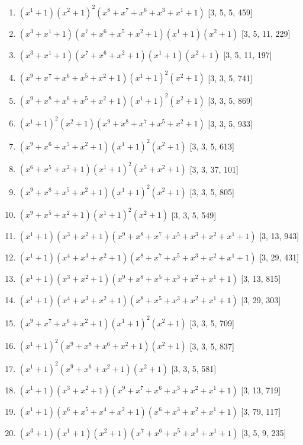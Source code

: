\documentclass[10pt,twocolumn]{article}
\begin{document}
\begin{enumerate}
\item $(x^{1} + 1)(x^{2} + 1)^{2}(x^{8} + x^{7} + x^{6} + x^{3} + x^{1} + 1)$  [3, 5, 5, 459]
\item $(x^{3} + x^{1} + 1)(x^{7} + x^{6} + x^{5} + x^{2} + 1)(x^{1} + 1)(x^{2} + 1)$  [3, 5, 11, 229]
\item $(x^{3} + x^{1} + 1)(x^{7} + x^{6} + x^{2} + 1)(x^{1} + 1)(x^{2} + 1)$  [3, 5, 11, 197]
\item $(x^{9} + x^{7} + x^{6} + x^{5} + x^{2} + 1)(x^{1} + 1)^{2}(x^{2} + 1)$  [3, 3, 5, 741]
\item $(x^{9} + x^{8} + x^{6} + x^{5} + x^{2} + 1)(x^{1} + 1)^{2}(x^{2} + 1)$  [3, 3, 5, 869]
\item $(x^{1} + 1)^{2}(x^{2} + 1)(x^{9} + x^{8} + x^{7} + x^{5} + x^{2} + 1)$  [3, 3, 5, 933]
\item $(x^{9} + x^{6} + x^{5} + x^{2} + 1)(x^{1} + 1)^{2}(x^{2} + 1)$  [3, 3, 5, 613]
\item $(x^{6} + x^{5} + x^{2} + 1)(x^{1} + 1)^{2}(x^{5} + x^{2} + 1)$  [3, 3, 37, 101]
\item $(x^{9} + x^{8} + x^{5} + x^{2} + 1)(x^{1} + 1)^{2}(x^{2} + 1)$  [3, 3, 5, 805]
\item $(x^{9} + x^{5} + x^{2} + 1)(x^{1} + 1)^{2}(x^{2} + 1)$  [3, 3, 5, 549]
\item $(x^{1} + 1)(x^{3} + x^{2} + 1)(x^{9} + x^{8} + x^{7} + x^{5} + x^{3} + x^{2} + x^{1} + 1)$  [3, 13, 943]
\item $(x^{1} + 1)(x^{4} + x^{3} + x^{2} + 1)(x^{8} + x^{7} + x^{5} + x^{3} + x^{2} + x^{1} + 1)$  [3, 29, 431]
\item $(x^{1} + 1)(x^{3} + x^{2} + 1)(x^{9} + x^{8} + x^{5} + x^{3} + x^{2} + x^{1} + 1)$  [3, 13, 815]
\item $(x^{1} + 1)(x^{4} + x^{3} + x^{2} + 1)(x^{8} + x^{5} + x^{3} + x^{2} + x^{1} + 1)$  [3, 29, 303]
\item $(x^{9} + x^{7} + x^{6} + x^{2} + 1)(x^{1} + 1)^{2}(x^{2} + 1)$  [3, 3, 5, 709]
\item $(x^{1} + 1)^{2}(x^{9} + x^{8} + x^{6} + x^{2} + 1)(x^{2} + 1)$  [3, 3, 5, 837]
\item $(x^{1} + 1)^{2}(x^{9} + x^{6} + x^{2} + 1)(x^{2} + 1)$  [3, 3, 5, 581]
\item $(x^{1} + 1)(x^{3} + x^{2} + 1)(x^{9} + x^{7} + x^{6} + x^{3} + x^{2} + x^{1} + 1)$  [3, 13, 719]
\item $(x^{1} + 1)(x^{6} + x^{5} + x^{4} + x^{2} + 1)(x^{6} + x^{3} + x^{2} + x^{1} + 1)$  [3, 79, 117]
\item $(x^{3} + 1)(x^{1} + 1)(x^{2} + 1)(x^{7} + x^{6} + x^{5} + x^{3} + x^{1} + 1)$  [3, 5, 9, 235]

\end{enumerate}
\end{document}
